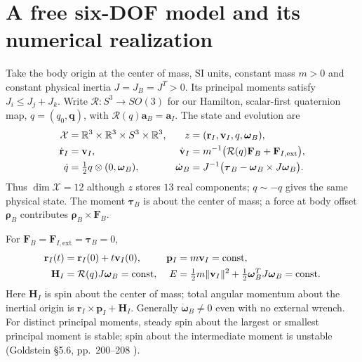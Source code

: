 \section{A free six-DOF model and its numerical realization}
\label{gnc:sec:free-simulation}
Take the body origin at the center of mass, SI units, constant mass $m>0$
and constant physical inertia $J=J_B=J^T>0$. Its principal moments satisfy
$J_i\le J_j+J_k$. Write $\mathcal R:S^3\to SO(3)$ for our Hamilton,
scalar-first quaternion map, $q=(q_0,\mathbf q)$, with
$\mathcal R(q)\mathbf a_B=\mathbf a_I$. The state and evolution are
\begin{align}
 \mathcal X&=\mathbb R^3\times\mathbb R^3\times S^3\times\mathbb R^3,
 &z&=(\mathbf r_I,\mathbf v_I,q,\boldsymbol\omega_B),\notag\\
 \dot{\mathbf r}_I&=\mathbf v_I,
 &\dot{\mathbf v}_I&=m^{-1}\bigl(\mathcal R(q)\mathbf F_B+
                              \mathbf F_{I,\mathrm{ext}}\bigr),\notag\\
 \dot q&=\tfrac12 q\otimes(0,\boldsymbol\omega_B),
 &\dot{\boldsymbol\omega}_B
 &=J^{-1}\bigl(\boldsymbol\tau_B-
                  \boldsymbol\omega_B\times J\boldsymbol\omega_B\bigr).
 \label{gnc:simulation-rhs}
\end{align}
Thus $\dim\mathcal X=12$ although $z$ stores $13$ real components;
$q\sim-q$ gives the same physical state. The moment $\boldsymbol\tau_B$
is about the center of mass; a force at body offset $\boldsymbol\rho_B$
contributes $\boldsymbol\rho_B\times\mathbf F_B$.

For $\mathbf F_B=\mathbf F_{I,\mathrm{ext}}=\boldsymbol\tau_B=0$,
\begin{align}
 \mathbf r_I(t)&=\mathbf r_I(0)+t\mathbf v_I(0),
 &\mathbf p_I&=m\mathbf v_I=\mathrm{const},\notag\\
 \mathbf H_I&=\mathcal R(q)J\boldsymbol\omega_B=\mathrm{const},
 &E&=\tfrac12m\lVert\mathbf v_I\rVert^2+
            \tfrac12\boldsymbol\omega_B^TJ\boldsymbol\omega_B
            =\mathrm{const}.\label{gnc:simulation-invariants}
\end{align}
Here $\mathbf H_I$ is spin about the center of mass; total angular momentum
about the inertial origin is $\mathbf r_I\times\mathbf p_I+\mathbf H_I$.
Generally $\dot{\boldsymbol\omega}_B\ne0$ even with no external wrench.
For distinct principal moments, steady spin about the largest or smallest
principal moment is stable; spin about the intermediate moment is unstable
(Goldstein \S5.6, pp.~200--208 \cite{dgdt:GPS2001}).

